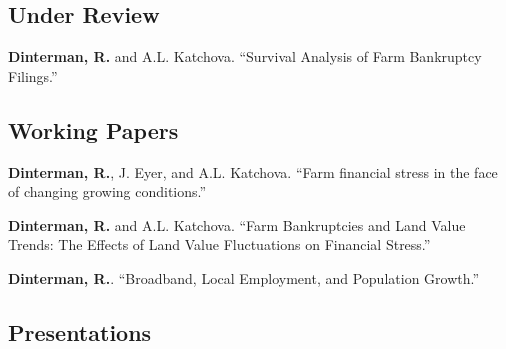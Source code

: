 \documentclass[letterpaper]{article}
\renewenvironment{itemize}{
  \begin{list}{}{
    \setlength{\leftmargin}{1.5em}
  }
}{
  \end{list}
}
\begin{document}
\subsection*{Under Review}

\begin{itemize}
\item \textbf{Dinterman, R.} and A.L. Katchova. ``Survival Analysis of Farm Bankruptcy Filings.''
\end{itemize}

\subsection*{Working Papers}

\begin{itemize}
\item \textbf{Dinterman, R.}, J. Eyer, and A.L. Katchova. ``Farm financial stress in the face of changing growing conditions.''
\item \textbf{Dinterman, R.} and A.L. Katchova. ``Farm Bankruptcies and Land Value Trends: The Effects of Land Value Fluctuations on Financial Stress.''
\item \textbf{Dinterman, R.}. ``Broadband, Local Employment, and Population Growth.''
\end{itemize}

% 

\subsection*{Presentations}
\end{document}
